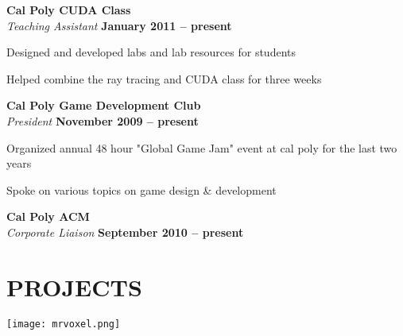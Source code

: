 \documentclass[margin,line]{resume}
\begin{document}
\begin{resume}
  \textbf{\listing Cal Poly CUDA Class}\\\vspace{1mm}%
  \textsl{Teaching Assistant} \hfill \textbf{ January 2011 -- present}\vspace{-3mm}\\\vspace{-1mm}%
    \begin{list2}
      \item Designed and developed labs and lab resources for students
        \item Helped combine the ray tracing and CUDA class for three weeks
    \end{list2}\vspace{-1.5mm}

  \textbf{\listing Cal Poly Game Development Club}\\\vspace{1mm}%
  \textsl{President}\hfill \textbf{ November 2009 -- present}\vspace{-3mm}\\\vspace{-1mm}%
    \begin{list2}
      \item Organized annual 48 hour "Global Game Jam" event at cal poly for the last two years
        \item Spoke on various topics on game design \& development
    \end{list2}\vspace{-1.5mm}

  \textbf{\listing Cal Poly ACM}\\\vspace{1mm}%
  \textsl{Corporate Liaison} \hfill \textbf{ September 2010 -- present}\vspace{-3mm}\\\vspace{-1mm}%


\sectionline

    \section{\mysidestyle \textbf{\large{P}\small{ROJECTS}}}

    \vspace{1mm}\hspace{2mm}\texttt{[image: mrvoxel.png]}\vspace{-15mm}


\end{resume}
\end{document}
